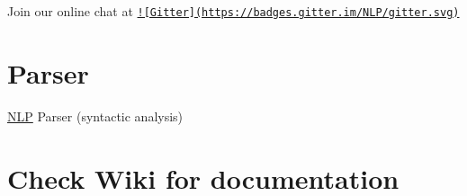 Join our online chat at \href{https://gitter.im/nlp}{\tt !\mbox{[}Gitter\mbox{]}(https\-://badges.\-gitter.\-im/\-N\-L\-P/gitter.\-svg)}

\section*{Parser}

\hyperlink{namespaceNLP}{N\-L\-P} Parser (syntactic analysis)

\section*{Check Wiki for documentation}